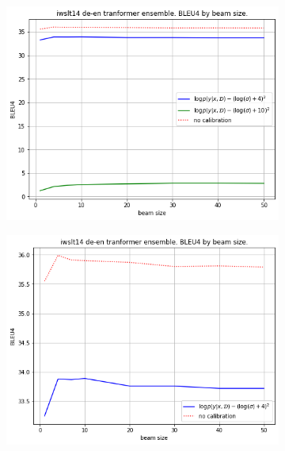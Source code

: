 \documentclass[a4paper,14pt]{extarticle}
\begin{document}
	\begin{figure}[t]
		\begin{subfigure}{.5\textwidth}
			\includegraphics[width=\textwidth]{images/calibratin_bleu_all.png}
			\center{\caption{}}
		\end{subfigure}
		\begin{subfigure}{.5\textwidth}
			\includegraphics[width=\textwidth]{images/calibration_bleu_best.png}
			\center{\caption{}}
		\end{subfigure}
	\end{figure}
	
\end{document}
